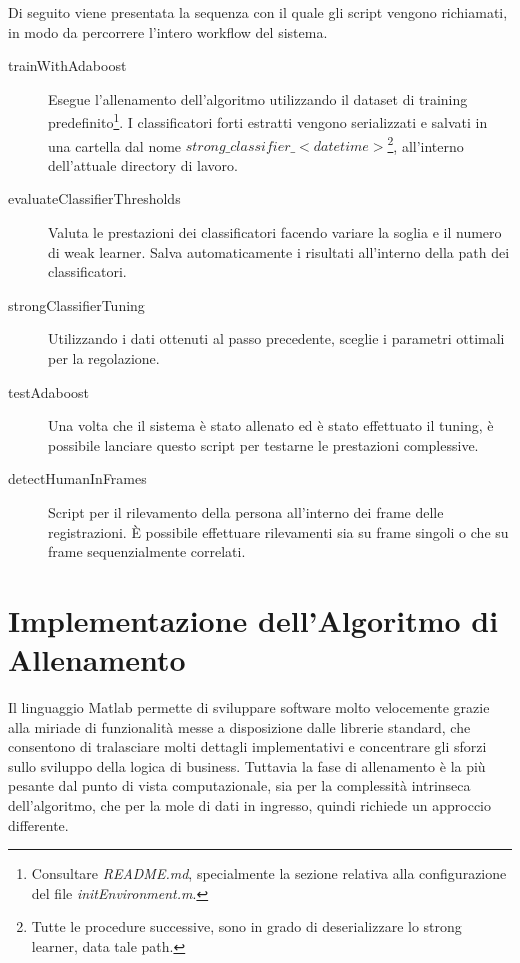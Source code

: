         Di seguito viene presentata la sequenza con il quale gli script vengono richiamati, in modo da percorrere l'intero workflow del sistema.
        \begin{description}
            \item[trainWithAdaboost] Esegue l'allenamento dell'algoritmo utilizzando il dataset di training predefinito\footnote{Consultare \emph{README.md}, specialmente la sezione relativa alla configurazione del file \emph{initEnvironment.m}.}.
            I classificatori forti estratti vengono serializzati e salvati in una cartella dal nome $strong\_classifier\_<datetime>$\footnote{Tutte le procedure successive, sono in grado di deserializzare lo strong learner, data tale path.}, all'interno dell'attuale directory di lavoro.

            \item[evaluateClassifierThresholds] Valuta le prestazioni dei classificatori facendo variare la soglia e il numero di weak learner.
            Salva automaticamente i risultati all'interno della path dei classificatori.

            \item[strongClassifierTuning] Utilizzando i dati ottenuti al passo precedente, sceglie i parametri ottimali per la regolazione.

            \item[testAdaboost] Una volta che il sistema è stato allenato ed è stato effettuato il tuning, è possibile lanciare questo script per testarne le prestazioni complessive.

            \item[detectHumanInFrames] Script per il rilevamento della persona all'interno dei frame delle registrazioni.
            È possibile effettuare rilevamenti sia su frame singoli o che su frame sequenzialmente correlati.
        \end{description}


    \section{Implementazione dell'Algoritmo di Allenamento}
        Il linguaggio Matlab permette di sviluppare software molto velocemente grazie alla miriade di funzionalità messe a disposizione dalle librerie standard, che consentono di tralasciare molti dettagli implementativi e concentrare gli sforzi sullo sviluppo della logica di business.
        Tuttavia la fase di allenamento è la più pesante dal punto di vista computazionale, sia per la complessità intrinseca dell'algoritmo, che per la mole di dati in ingresso, quindi richiede un approccio differente.

